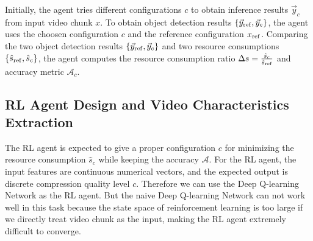 Initially, the agent tries different configurations $ c $ to obtain inference results $\vec{y}_c$ from input video chunk $ x $. To obtain object detection results $ \{\vec{y}_{\rm ref}, \vec{y}_c\} $, the agent uses the choosen configuration $ c $ and the reference configuration $ x_{\rm ref} $. Comparing the two object detection results $ \{\vec{y}_{\rm ref}, \vec{y}_c\} $ and two resource consumptions $ \{\hat{s}_{\rm ref}, \hat{s}_c\} $, the agent computes the resource consumption ratio $ \Delta s = \frac{\hat{s}_c}{\hat{s}_{\rm ref}} $ and accuracy metric $ \mathcal{A}_c $.

\subsection{RL Agent Design and Video Characteristics Extraction}

The RL agent is expected to give a proper configuration $ c $ for minimizing the resource consumption $ \hat{s}_c $ while keeping the accuracy $ \mathcal{A} $. For the RL agent, the input features are continuous numerical vectors, and the expected output is discrete compression quality level $ c $. Therefore we can use the Deep Q-learning Network \cite{DQN} as the RL agent. But the naive Deep Q-learning Network can not work well in this task because the state space of reinforcement learning is too large if we directly treat video chunk as the input, making the RL agent extremely difficult to converge.  


%

